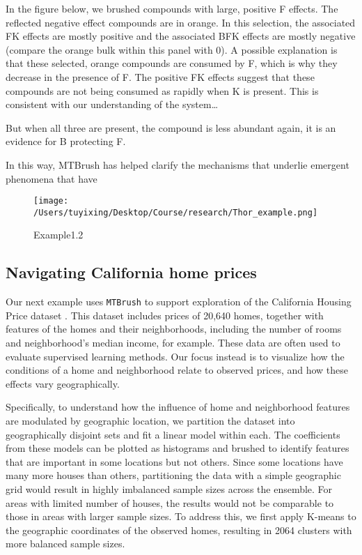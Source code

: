\documentclass[
]{article}
\begin{document}
In the figure below, we brushed compounds with large, positive F
effects. The reflected negative effect compounds are in orange. In this
selection, the associated FK effects are mostly positive and the
associated BFK effects are mostly negative (compare the orange bulk
within this panel with 0). A possible explanation is that these
selected, orange compounds are consumed by F, which is why they decrease
in the presence of F. The positive FK effects suggest that these
compounds are not being consumed as rapidly when K is present. This is
consistent with our understanding of the system\ldots{}

But when all three are present, the compound is less abundant again, it
is an evidence for B protecting F.

In this way, MTBrush has helped clarify the mechanisms that underlie
emergent phenomena that have

\begin{figure}
\centering
\texttt{[image: /Users/tuyixing/Desktop/Course/research/Thor\_example.png]}
\caption{Example1.2}
\end{figure}

\hypertarget{navigating-california-home-prices}{%
\subsection{Navigating California home
prices}\label{navigating-california-home-prices}}

Our next example uses \texttt{MTBrush} to support exploration of the
California Housing Price dataset \cite{give citation}. This dataset
includes prices of 20,640 homes, together with features of the homes and
their neighborhoods, including the number of rooms and neighborhood's
median income, for example. These data are often used to evaluate
supervised learning methods. Our focus instead is to visualize how the
conditions of a home and neighborhood relate to observed prices, and how
these effects vary geographically.

Specifically, to understand how the influence of home and neighborhood
features are modulated by geographic location, we partition the dataset
into geographically disjoint sets and fit a linear model within each.
The coefficients from these models can be plotted as histograms and
brushed to identify features that are important in some locations but
not others. Since some locations have many more houses than others,
partitioning the data with a simple geographic grid would result in
highly imbalanced sample sizes across the ensemble. For areas with
limited number of houses, the results would not be comparable to those
in areas with larger sample sizes. To address this, we first apply
K-means to the geographic coordinates of the observed homes, resulting
in 2064 clusters with more balanced sample sizes.
\end{document}
